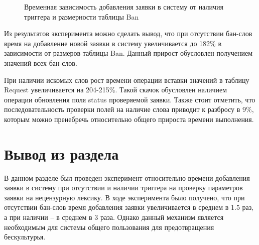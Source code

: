 \begin{figure}[H]
	\captionsetup{singlelinecheck = false, justification=centering}
	\centering
	\caption{Временная зависимость добавления заявки в систему от наличия триггера и размерности таблицы Ban}
	\label{time_graphic}
\end{figure}

Из результатов эксперимента можно сделать вывод, что при отсутствии бан-слов время на добавление новой заявки в систему увеличивается до 182\% в зависимости от размеров таблицы Ban. Данный прирост обусловлен получением значений всех бан-слов.

При наличии искомых слов рост времени операции вставки значений в таблицу Request увеличивается на 204-215\%. Такой скачок обусловлен наличием операции обновления поля status проверяемой заявки. Также стоит отметить, что последовательность проверки полей на наличие слова приводит к разбросу в 9\%, которым можно пренебречь относительно общего прироста времени выполнения. 

\section{Вывод из раздела}

В данном разделе был проведен эксперимент относительно времени добавления заявки в систему при отсутствии и наличии триггера на проверку параметров заявки на нецензурную лексику. В ходе эксперимента было получено, что при отсутствии бан-слов время добавления заявки увеличивается в среднем в 1.5 раз, а при наличии -- в среднем в 3 раза. Однако данный механизм является необходимым для системы общего пользования для предотвращения бескультурья. 